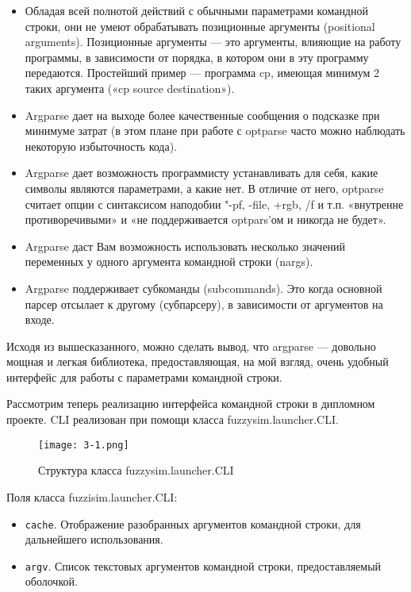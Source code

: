 \begin{itemize}
	\item Обладая всей полнотой действий с обычными параметрами командной строки, они не умеют обрабатывать позиционные аргументы (positional arguments). Позиционные аргументы — это аргументы, влияющие на работу программы, в зависимости от порядка, в котором они в эту программу передаются. Простейший пример — программа cp, имеющая минимум 2 таких аргумента («cp source destination»).
	\item  Argparse дает на выходе более качественные сообщения о подсказке при минимуме затрат (в этом плане при работе с optparse часто можно наблюдать некоторую избыточность кода).
	\item Argparse дает возможность программисту устанавливать для себя, какие символы являются параметрами, а какие нет. В отличие от него, optparse считает опции с синтаксисом наподобии "-pf, -file, +rgb, /f и т.п. «внутренне противоречивыми» и «не поддерживается optpars'ом и никогда не будет».
	\item Argparse даст Вам возможность использовать несколько значений переменных у одного аргумента командной строки (nargs).
	\item Argparse поддерживает субкоманды (subcommands). Это когда основной парсер отсылает к другому (субпарсеру), в зависимости от аргументов на входе.
\end{itemize}

Исходя из вышесказанного, можно сделать вывод, что argparse — довольно мощная и легкая библиотека, предоставляющая, на мой взгляд, очень удобный интерфейс для работы с параметрами командной строки.

Рассмотрим теперь реализацию интерфейса командной строки в дипломном проекте. CLI реализован при помощи класса fuzzysim.launcher.CLI.

\begin{figure}[ht]
  \centering
  \texttt{[image: 3-1.png]}
  \caption{ Структура класса fuzzysim.launcher.CLI }
  \label{fig:func:1}
\end{figure}

Поля класса fuzzisim.launcher.CLI:
\begin{itemize}
  \item \lstinline!cache!. Отображение разобранных аргументов командной строки, для дальнейшего использования.
  \item \lstinline!argv!. Список текстовых аргументов командной строки, предоставляемый оболочкой.
\end{itemize}

